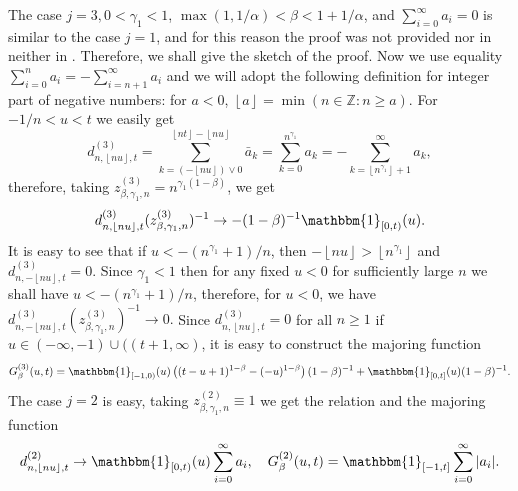 \documentclass[12pt]{article}
\def\bz{{\bf Z}}
\def\bz{{\mathbb Z}} %
\def\a{\alpha}
\def\b{\beta}
\def\g{\gamma}
\newcommand{\ind}[1]{\mathbbm{1}_{#1}}
\newcommand{\sv}[1]{\left\lfloor #1 \right\rfloor}
\theoremstyle{plain}
\theoremstyle{definition}
\begin{document}
The case $j=3, 0<\g_1<1$, $\max (1, 1/\a)<\b<1+1/\a$, and $\sum_{i=0}^\infty a_i=0$ is similar to the case $j=1$, and for this reason  the proof was not provided nor in \cite{PaulDam4} neither in \cite{PaulDam5}. Therefore, we shall give the sketch of the proof. Now we use equality $\sum_{i=0}^n a_i=-\sum_{i=n+1}^\infty a_i$ and we will adopt the following definition for integer part of negative numbers: for $a<0$,  $\sv{a}=\min (n\in \bz: n\ge a)$.  For $-1/n<u<t$ we easily get
$$
d_{n, \sv{nu}, t}^{(3)} =\sum_{k=\left( -\sv{nu} \right)\vee 0 }^{\sv{nt}-\sv{nu}}{\bar a}_{k}=\sum_{k=0 }^{n^{\g_1}} a_{k}=-\sum_{k=\sv{n^{\g_1}}+1}^\infty a_{k},
$$
therefore, taking $z_{\b, \g_1, n}^{(3)}=n^{\g_1(1-\b)}$, we  get
$$
d_{n, \sv{nu}, t}^{(3)}(z_{\b, \g_1, n}^{(3)})^{-1}\rightarrow  -(1-\b)^{-1}\ind{[0,t)}(u).
$$
It is easy to see that if $u<-(n^{\g_1}+1)/n$, then $-\sv{nu}>\sv{n^{\g_1}}$ and $d_{n, -\sv{nu}, t}^{(3)}=0$. Since $\g_1<1$ then for any fixed $u<0$ for sufficiently large $n$ we shall have $u<-(n^{\g_1}+1)/n$, therefore, for $u<0$, we have
$d_{n, -\sv{nu}, t}^{(3)}(z_{\b, \g_1, n}^{(3)})^{-1}\rightarrow  0.$
Since $d_{n, \sv{nu}, t}^{(3)} =0$ for all $n\ge 1$ if $u\in (-\infty, -1)\cup ((t+1, \infty)$, it is  easy to construct the majoring function
$$
G_{\b}^{(3)}(u,t)=\ind{[-1, 0)}(u)\left ( (t-u+1)^{1-\b} -(-u)^{1-\b}\right )(1-\b)^{-1}+\ind{[0, t]}(u)(1-\b)^{-1}.
$$
The case $j=2$ is easy, taking $z_{\b, \g_1, n}^{(2)}\equiv 1$ we get the relation and the majoring function
$$
d_{n, \sv{nu}, t}^{(2)}\rightarrow  \ind{[0,t)}(u)\sum_{i=0}^\infty a_i, \quad G_{\b}^{(2)}(u,t)=\ind{[-1, t]}\sum_{i=0}^\infty |a_i|.
$$
\end{document}
